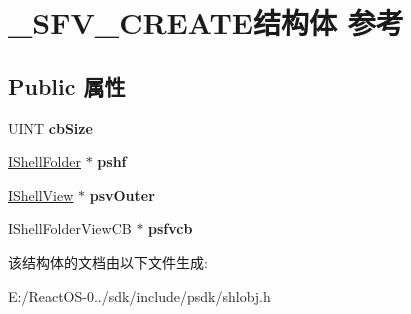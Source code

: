 \hypertarget{struct___s_f_v___c_r_e_a_t_e}{}\section{\+\_\+\+S\+F\+V\+\_\+\+C\+R\+E\+A\+T\+E结构体 参考}
\label{struct___s_f_v___c_r_e_a_t_e}
\subsection*{Public 属性}
\begin{DoxyCompactItemize}
\item 
\mbox{\label{struct___s_f_v___c_r_e_a_t_e_a86671e3678a988827aa7e9308a1de4b0}} 
U\+I\+NT {\bfseries cb\+Size}
\item 
\mbox{\label{struct___s_f_v___c_r_e_a_t_e_ad8ff75fda63a3daf448da174c76c6df0}} 
\hyperlink{interface_i_shell_folder}{I\+Shell\+Folder} $\ast$ {\bfseries pshf}
\item 
\mbox{\label{struct___s_f_v___c_r_e_a_t_e_a7ca18db9835c7ec00cf100d0bc411617}} 
\hyperlink{interface_i_shell_view}{I\+Shell\+View} $\ast$ {\bfseries psv\+Outer}
\item 
\mbox{\label{struct___s_f_v___c_r_e_a_t_e_a469ff67e035bb55a1cc474fb990f8b0f}} 
I\+Shell\+Folder\+View\+CB $\ast$ {\bfseries psfvcb}
\end{DoxyCompactItemize}


该结构体的文档由以下文件生成\+:\begin{DoxyCompactItemize}
\item 
E\+:/\+React\+O\+S-\/0../sdk/include/psdk/shlobj.\+h\end{DoxyCompactItemize}
